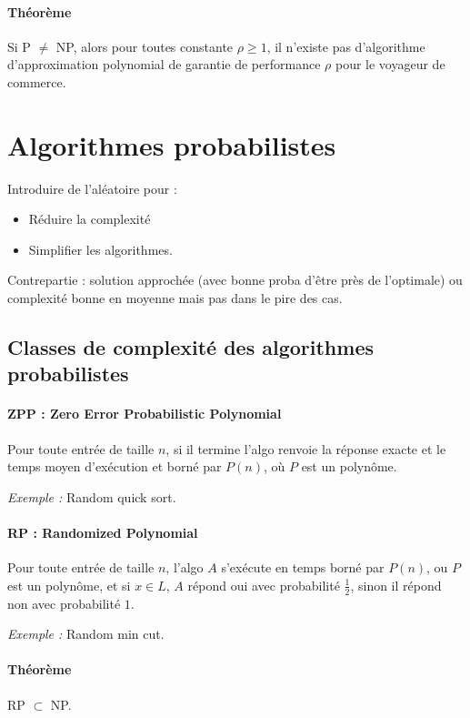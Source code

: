 \documentclass[french]{article}
\begin{document}
\paragraph{Théorème} Si P $\neq$ NP, alors pour toutes constante $\rho \geq 1$, il n’existe pas d’algorithme d’approximation polynomial de garantie de performance $\rho$ pour le voyageur de commerce.




\section{Algorithmes probabilistes}

\noindent Introduire de l’aléatoire pour :
\begin{itemize}
\item Réduire la complexité
\item Simplifier les algorithmes.
\end{itemize}
Contrepartie : solution approchée (avec bonne proba d’être près de l’optimale) ou complexité bonne en moyenne mais pas dans le pire des cas.

\subsection{Classes de complexité des algorithmes probabilistes}

\paragraph{ZPP : Zero Error Probabilistic Polynomial} Pour toute entrée de taille $n$, si il termine l’algo renvoie la réponse exacte et le temps moyen d’exécution et borné par $P(n)$, où $P$ est un polynôme. 

\emph{Exemple :} Random quick sort. 

\paragraph{RP : Randomized Polynomial} Pour toute entrée de taille $n$, l’algo $A$ s’exécute en temps borné par $P(n)$, ou $P$ est un polynôme, et si $x \in L$, $A$ répond \og oui \fg{} avec probabilité $\frac{1}{2}$, sinon il répond non avec probabilité $1$.

\emph{Exemple :} Random min cut. 

\paragraph{Théorème} RP $\subset$ NP.
\end{document}
